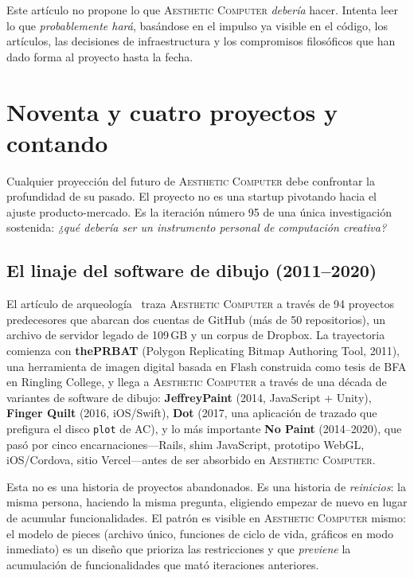 \documentclass[10pt,letterpaper,twocolumn]{article}
\newcommand{\ac}{\textsc{Aesthetic Computer}}
\begin{document}
Este artículo no propone lo que \ac{} \emph{debería} hacer. Intenta leer lo que \emph{probablemente hará}, basándose en el impulso ya visible en el código, los artículos, las decisiones de infraestructura y los compromisos filosóficos que han dado forma al proyecto hasta la fecha.


\section{Noventa y cuatro proyectos y contando}
\label{sec:history}

Cualquier proyección del futuro de \ac{} debe confrontar la profundidad de su pasado. El proyecto no es una startup pivotando hacia el ajuste producto-mercado. Es la iteración número 95 de una única investigación sostenida: \emph{¿qué debería ser un instrumento personal de computación creativa?}

\subsection{El linaje del software de dibujo (2011--2020)}

El artículo de arqueología~\citep{scudder2026archaeology} traza \ac{} a través de 94 proyectos predecesores que abarcan dos cuentas de GitHub (más de 50 repositorios), un archivo de servidor legado de 109\,GB y un corpus de Dropbox. La trayectoria comienza con \textbf{thePRBAT} (Polygon Replicating Bitmap Authoring Tool, 2011), una herramienta de imagen digital basada en Flash construida como tesis de BFA en Ringling College, y llega a \ac{} a través de una década de variantes de software de dibujo: \textbf{JeffreyPaint} (2014, JavaScript + Unity), \textbf{Finger Quilt} (2016, iOS/Swift), \textbf{Dot} (2017, una aplicación de trazado que prefigura el disco \texttt{plot} de AC), y lo más importante \textbf{No Paint} (2014--2020), que pasó por cinco encarnaciones---Rails, shim JavaScript, prototipo WebGL, iOS/Cordova, sitio Vercel---antes de ser absorbido en \ac{}.

Esta no es una historia de proyectos abandonados. Es una historia de \emph{reinicios}: la misma persona, haciendo la misma pregunta, eligiendo empezar de nuevo en lugar de acumular funcionalidades. El patrón es visible en \ac{} mismo: el modelo de pieces (archivo único, funciones de ciclo de vida, gráficos en modo inmediato) es un diseño que prioriza las restricciones y que \emph{previene} la acumulación de funcionalidades que mató iteraciones anteriores.
\end{document}
